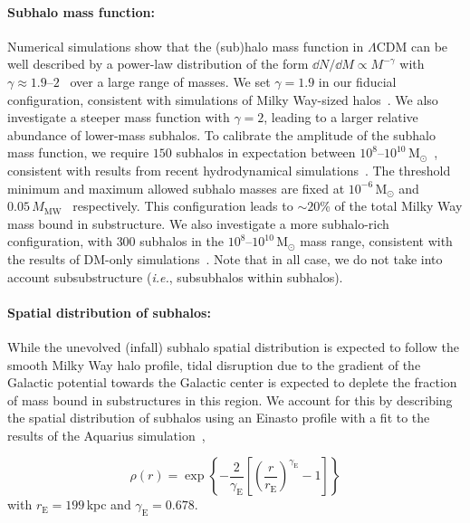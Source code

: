 \documentclass[prd,aps,twocolumn,nofootinbib,superscriptaddress,preprintnumbers,balancelastpage,longbibliography,floatfix]{revtex4-1}
\begin{document}
\paragraph*{Subhalo mass function:} Numerical simulations show that the (sub)halo mass function in $\Lambda$CDM can be well described by a power-law distribution of the form $\dd N/\dd M\propto M^{-\gamma}$ with $\gamma\approx1.9$--$2$~\cite{Moline:2016pbm} over a large range of masses. We set $\gamma=1.9$ in our fiducial configuration, consistent with simulations of Milky Way-sized halos~\cite{Madau:2008fr,Springel:2008cc}. We also investigate a steeper mass function with $\gamma=2$, leading to a larger relative abundance of lower-mass subhalos. To calibrate the amplitude of the subhalo mass function, we require $150$ subhalos in expectation between $10^8$--$10^{10}$\,M$_\odot$~\cite{Hutten:2016jko}, consistent with results from recent hydrodynamical simulations~\cite{Mollitor:2014ara,Sawala:2015cdf}. The threshold minimum and maximum allowed subhalo masses are fixed at $10^{-6}$\,M$_\odot$ and $0.05\,M_\mathrm{MW}$~\cite{Hiroshima:2018kfv} respectively. This configuration leads to $\sim20$\% of the total Milky Way mass bound in substructure. We also investigate a more subhalo-rich configuration, with $300$ subhalos in the $10^8$--$10^{10}$\,M$_\odot$ mass range, consistent with the results of DM-only simulations~\cite{Roos:2012cc}. Note that in all case, we do not take into account subsubstructure (\emph{i.e.}, subsubhalos within subhalos).

\paragraph*{Spatial distribution of subhalos:}  While the unevolved (infall) subhalo spatial distribution is expected to follow the smooth Milky Way halo profile, tidal disruption due to the gradient of the Galactic potential towards the Galactic center is expected to deplete the fraction of mass bound in substructures in this region. We account for this by describing the spatial distribution of subhalos using an Einasto profile with a fit to the results of the Aquarius simulation~\cite{Roos:2012cc,Hutten:2016jko}, 

\begin{equation}
\rho(r) = \exp\left\lbrace-\frac{2}{\gamma_\mathrm{E}}\left[\left(\frac{r}{r_\mathrm{E}}\right)^{\gamma_\mathrm{E}} - 1\right]\right\rbrace
\end{equation}
with $r_\mathrm{E}=199$\,kpc and $\gamma_\mathrm{E}=0.678$.
\end{document}
